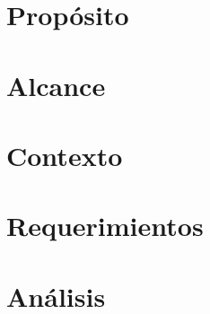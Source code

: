 \documentclass[11pt]{article}
\begin{document}


\newpage



\newpage



\newpage


\tableofcontents
\newpage
        

\section{Propósito}



\section{Alcance}



\section{Contexto}

 

\section{Requerimientos}



\section{Análisis}

\end{document}
